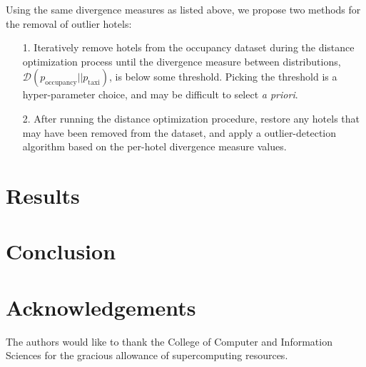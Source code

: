 \documentclass[useAMS, referee, usenatbib]{biom}
\begin{document}
Using the same divergence measures as listed above, we propose two methods for the removal of outlier hotels:

\begin{itemize}

\item [1.] Iteratively remove hotels from the occupancy dataset during the distance optimization process until the divergence measure between distributions, $\mathcal{D} (p_{\mathrm{occupancy}} || p_{\mathrm{taxi}})$, is below some threshold. Picking the threshold is a hyper-parameter choice, and may be difficult to select \textit{a priori}.

\item [2.] After running the distance optimization procedure, restore any hotels that may have been removed from the dataset, and apply a outlier-detection algorithm based on the per-hotel divergence measure values.

\end{itemize}

\section{Results}
\label{s:results}

\section{Conclusion}
\label{s:conclusion}

\backmatter

\section*{Acknowledgements}

The authors would like to thank the College of Computer and Information Sciences for the gracious allowance of supercomputing resources.

 


\label{lastpage}
\end{document}
